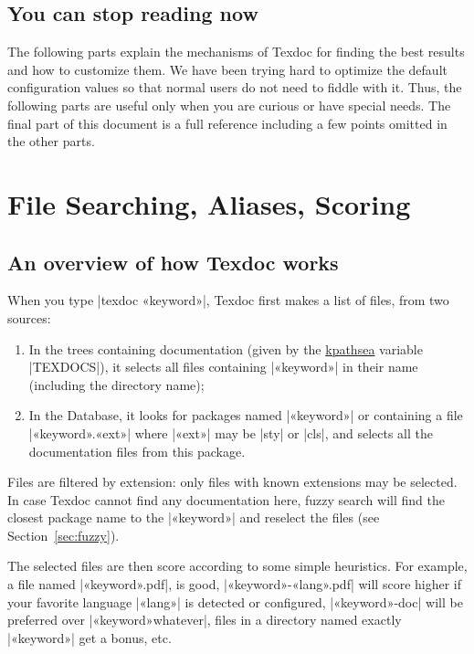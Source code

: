 \documentclass[draft]{texdoc-doc}
\begin{document}
\subsection{You can stop reading now}

The following parts explain the mechanisms of Texdoc for finding the best
results and how to customize them. We have been trying hard to optimize the
default configuration values so that normal users do not need to fiddle with
it. Thus, the following parts are useful only when you are curious or have
special needs. The final part of this document is a full reference including a
few points omitted in the other parts.

\clearpage

\section{File Searching, Aliases, Scoring}

\subsection{An overview of how Texdoc works}

When you type |texdoc «keyword»|, Texdoc first makes a list of files, from two
sources:
%
\begin{enumerate}
\item In the trees containing documentation (given by the
  \href{https://www.tug.org/kpathsea/} {kpathsea} variable |TEXDOCS|), it
  selects all files containing |«keyword»| in their name (including the
  directory name);
\item In the {\TL} Database, it looks for packages named
  |«keyword»| or containing a file |«keyword».«ext»| where |«ext»| may be
  |sty| or |cls|, and selects all the documentation files from this package.
\end{enumerate}
%
Files are filtered by extension: only files with known extensions may be
selected. In case Texdoc cannot find any documentation here, fuzzy search will
find the closest package name to the |«keyword»| and reselect the files (see
Section~\ref{sec:fuzzy}).

The selected files are then score according to some simple heuristics. For
example, a file named |«keyword».pdf|, is good, |«keyword»-«lang».pdf| will
score higher if your favorite language |«lang»| is detected or configured,
|«keyword»-doc| will be preferred over |«keyword»whatever|, files in a
directory named exactly |«keyword»| get a bonus, etc.
\end{document}
